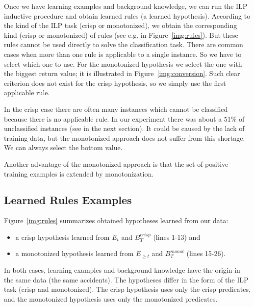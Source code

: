 Once we have learning examples and background knowledge, we can run the ILP inductive procedure and obtain learned rules (a learned hypothesis). According to the kind of the ILP task (crisp or monotonized), we obtain the corresponding kind (crisp or monotonized) of rules (see e.g. in Figure~\ref{img:rules}). But these rules cannot be used directly to solve the classification task. There are common cases when more than one rule is applicable to a single instance. So we have to select which one to use. For the monotonized hypothesis we select the one with the biggest return value; it is illustrated in Figure~\ref{img:conversion}. Such clear criterion does not exist for the crisp hypothesis, so we simply use the first applicable rule.


In the crisp case there are often many instances which cannot be classified because there is no applicable rule. In our experiment there was about a 51\%
of unclassified instances (see in the next section). It could be caused by the lack of training data, but the monotonized approach does not suffer from this shortage. We can always select the bottom value.

Another advantage of the monotonized approach is that the set of positive training examples is extended by monotonization. 





\subsection{Learned Rules Examples} \label{sec:results}

Figure~\ref{img:rules} summarizes obtained hypotheses learned from our data: 
\begin{itemize}
	\item a crisp hypothesis learned from $E_t$ and $B^{crisp}_{T}$ (lines 1-13) and
	\item a monotonized hypothesis learned from $E_{\ge t}$ and ${B}^{monot}_T$ (lines 15-26).
\end{itemize}


In both cases, learning examples and background knowledge have the origin in the same data (the same accidents). The hypotheses differ in the form of the ILP task (crisp and monotonized). The crisp hypothesis uses only the crisp predicates, and the monotonized hypothesis uses only the monotonized predicates.




